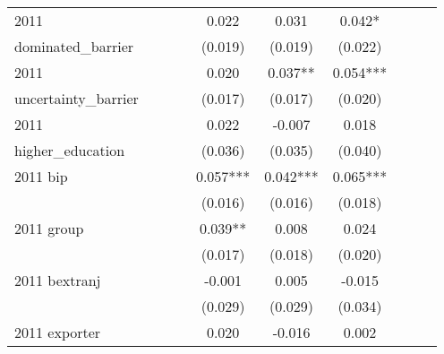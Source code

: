 \begin{table}[htbp]
\begin{tabular}{l*{9}{c}}
2011                &               &               &               &       0.022   &       0.031   &       0.042*  &               &               &               \\
dominated\_barrier   &               &               &               &     (0.019)   &     (0.019)   &     (0.022)   &               &               &               \\
2011                &               &               &               &       0.020   &       0.037** &       0.054***&               &               &               \\
uncertainty\_barrier &               &               &               &     (0.017)   &     (0.017)   &     (0.020)   &               &               &               \\
2011                &               &               &               &       0.022   &      -0.007   &       0.018   &               &               &               \\
higher\_education    &               &               &               &     (0.036)   &     (0.035)   &     (0.040)   &               &               &               \\
2011 bip            &               &               &               &       0.057***&       0.042***&       0.065***&               &               &               \\
                    &               &               &               &     (0.016)   &     (0.016)   &     (0.018)   &               &               &               \\
2011 group          &               &               &               &       0.039** &       0.008   &       0.024   &               &               &               \\
                    &               &               &               &     (0.017)   &     (0.018)   &     (0.020)   &               &               &               \\
2011 bextranj       &               &               &               &      -0.001   &       0.005   &      -0.015   &               &               &               \\
                    &               &               &               &     (0.029)   &     (0.029)   &     (0.034)   &               &               &               \\
2011 exporter       &               &               &               &       0.020   &      -0.016   &       0.002   &               &               &               \\

\end{tabular}
\end{table}
